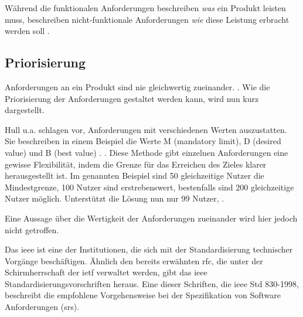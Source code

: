 Während die funktionalen Anforderungen beschreiben \textit{was} ein Produkt leisten muss, beschreiben nicht-funktionale Anforderungen \textit{wie} diese Leistung erbracht werden soll \citep[vgl.][30]{Partsch2010}.

\subsection{Priorisierung}

Anforderungen an ein Produkt sind nie gleichwertig zueinander. 
 \citep[][83]{Hull2010}. Wie die Priorisierung der Anforderungen gestaltet werden kann, wird nun kurz dargestellt.

Hull u.a. schlagen vor, Anforderungen mit verschiedenen Werten auszustatten. Sie beschreiben in einem Beispiel die Werte M (mandatory limit), D (desired value) und B (best value) \citep[vgl.][83]{Hull2010}.  \citep[][83]{Hull2010}.
Diese Methode gibt einzelnen Anforderungen eine gewisse Flexibilität, indem die Grenze für das Erreichen des Zieles klarer herausgestellt ist. Im genannten Beispiel sind 50 gleichzeitige Nutzer die Mindestgrenze, 100 Nutzer sind erstrebenswert, bestenfalls sind 200 gleichzeitige Nutzer möglich. Unterstützt die Lösung nun nur 99 Nutzer,  \citep[][83]{Hull2010}.

Eine Aussage über die Wertigkeit der Anforderungen zueinander wird hier jedoch nicht getroffen. 


Das \ac{ieee} ist eine der Institutionen, die sich mit der Standardisierung technischer Vorgänge beschäftigen. Ähnlich den bereits erwähnten \ac{rfc}, die unter der Schirmherrschaft der \ac{ietf} verwaltet werden, gibt das \ac{ieee} Standardisierungsvorschriften heraus. Eine dieser Schriften, die \ac{ieee} Std 830-1998, beschreibt die empfohlene Vorgehensweise bei der Spezifikation von Software Anforderungen (\ac{srs}).

